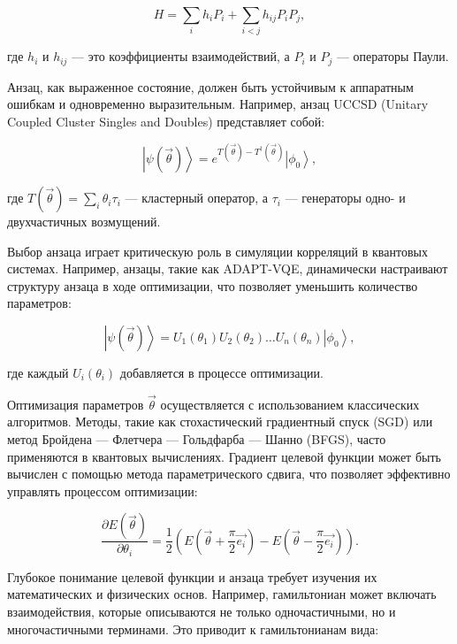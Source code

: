 \documentclass[a4paper]{report}
\newcommand{\ket}[1] {{\ensuremath{\left|#1\right\rangle}}}
\begin{document}
\begin{equation}
H = \sum_{i} h_i P_i + \sum_{i < j} h_{ij} P_i P_j,
\end{equation}

где $h_i$ и $h_{ij}$ — это коэффициенты взаимодействий, а $P_i$ и $P_j$ — операторы Паули.

Анзац, как выраженное состояние, должен быть устойчивым к аппаратным ошибкам и одновременно выразительным. Например, анзац UCCSD (Unitary Coupled Cluster Singles and Doubles) представляет собой:

\begin{equation}
\ket{\psi(\vec{\theta})} = e^{T(\vec{\theta}) - T^\dagger(\vec{\theta})} \ket{\phi_0},
\end{equation}

где $T(\vec{\theta}) = \sum_i \theta_i \tau_i$ — кластерный оператор, а $\tau_i$ — генераторы одно- и двухчастичных возмущений.

Выбор анзаца играет критическую роль в симуляции корреляций в квантовых системах. Например, анзацы, такие как ADAPT-VQE, динамически настраивают структуру анзаца в ходе оптимизации, что позволяет уменьшить количество параметров:

\begin{equation}
\ket{\psi(\vec{\theta})} = U_1(\theta_1) U_2(\theta_2) \dots U_n(\theta_n) \ket{\phi_0},
\end{equation}

где каждый $U_i(\theta_i)$ добавляется в процессе оптимизации.

Оптимизация параметров $\vec{\theta}$ осуществляется с использованием классических алгоритмов. Методы, такие как стохастический градиентный спуск (SGD) или метод Бройдена — Флетчера — Гольдфарба — Шанно (BFGS), часто применяются в квантовых вычислениях. Градиент целевой функции может быть вычислен с помощью метода параметрического сдвига, что позволяет эффективно управлять процессом оптимизации:

\begin{equation}
\frac{\partial E(\vec{\theta})}{\partial \theta_i} = \frac{1}{2} \left( E(\vec{\theta} + \frac{\pi}{2} \vec{e_i}) - E(\vec{\theta} - \frac{\pi}{2} \vec{e_i}) \right).
\end{equation}

Глубокое понимание целевой функции и анзаца требует изучения их математических и физических основ. Например, гамильтониан может включать взаимодействия, которые описываются не только одночастичными, но и многочастичными терминами. Это приводит к гамильтонианам вида:
\end{document}
